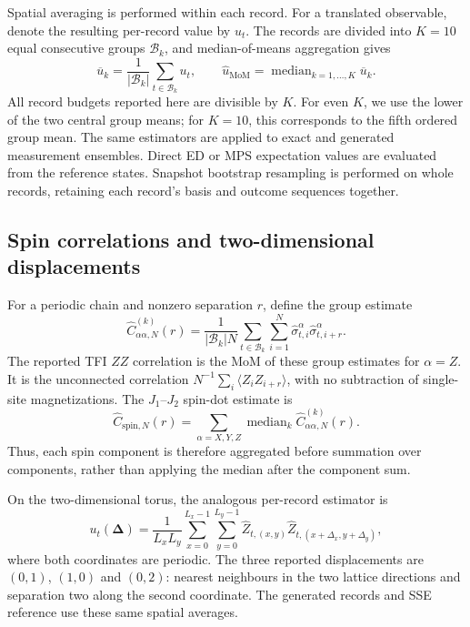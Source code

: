 \documentclass[11pt,a4paper]{article}
\newcommand{\TBD}[1]{\textcolor{red!70!black}{\textsf{[TBD: #1]}}}
\newcommand{\subhead}[1]{\subsection*{#1}}
\begin{document}
Spatial averaging is performed within each record. For a translated
observable, denote the resulting per-record value by $u_t$.
The records are divided into $K=10$ equal consecutive groups
$\mathcal{B}_k$, and median-of-means aggregation gives
\begin{equation}
\overline{u}_k
=
\frac{1}{|\mathcal{B}_k|}
\sum_{t\in\mathcal{B}_k}u_t,
\qquad
\widehat{u}_{\mathrm{MoM}}
=
\operatorname{median}_{k=1,\ldots,K}\overline{u}_k.
\label{supp:eq:mom}
\end{equation}
All record budgets reported here are divisible by $K$.
For even \(K\), we use the lower of the two central group means; for \(K=10\), this corresponds to the fifth ordered group mean.
The same estimators are applied to exact and generated measurement
ensembles. Direct ED or MPS expectation values are evaluated from
the reference states. Snapshot bootstrap resampling is performed on whole records, retaining each record's basis and outcome sequences together.

\subhead{Spin correlations and two-dimensional displacements}
For a periodic chain and nonzero separation $r$, define the group estimate
\begin{equation}
\widehat{C}^{(k)}_{\alpha\alpha,N}(r)
=\frac{1}{|\mathcal{B}_k|N}
\sum_{t\in\mathcal{B}_k}\sum_{i=1}^{N}
\widehat{\sigma}^{\alpha}_{t,i}
\widehat{\sigma}^{\alpha}_{t,i+r}.
\label{supp:eq:component_correlation}
\end{equation}
The reported TFI $ZZ$ correlation is the MoM of these group estimates
for $\alpha=Z$. It is the unconnected correlation
$N^{-1}\sum_i\langle Z_iZ_{i+r}\rangle$, with no subtraction of
single-site magnetizations. The $J_1$--$J_2$ spin-dot estimate is
\begin{equation}
\widehat{C}_{\mathrm{spin},N}(r)
=\sum_{\alpha=X,Y,Z}
\operatorname{median}_{k}\widehat{C}^{(k)}_{\alpha\alpha,N}(r).
\label{supp:eq:spin_dot}
\end{equation}
Thus, each spin component is therefore aggregated before summation over components, rather than applying the median after the component sum.

On the two-dimensional torus, the analogous per-record estimator is
\begin{equation}
u_t(\boldsymbol{\Delta})=
\frac{1}{L_xL_y}\sum_{x=0}^{L_x-1}\sum_{y=0}^{L_y-1}
\widehat{Z}_{t,(x,y)}
\widehat{Z}_{t,(x+\Delta_x,y+\Delta_y)},
\label{supp:eq:2d_correlation}
\end{equation}
where both coordinates are periodic. The three reported displacements
are $(0,1)$, $(1,0)$ and $(0,2)$: nearest neighbours in the two lattice
directions and separation two along the second coordinate.
The generated records and SSE reference use these same spatial averages.
\end{document}

